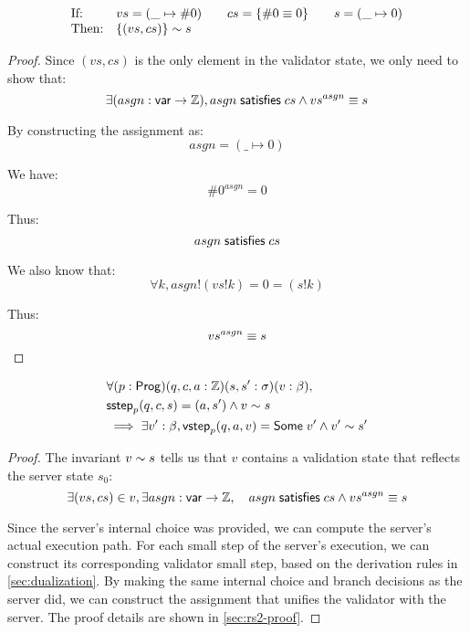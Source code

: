 \begin{lemma}[\ref{eq:rs1}]
\[\begin{array}{ll}
\text{If:}&
vs=(\_\mapsto\#0)\qquad
cs=\{\#0\equiv0\}\qquad
s=(\_\mapsto0)\\
\text{Then:}&\{(vs,cs)\}\sim s
\end{array}\]
\end{lemma}
\begin{proof}
Since $(vs,cs)$ is the only element in the validator state, we only need to show
that:
\[\exists(asgn:\mathsf{var}\to\mathbb Z),asgn\;\mathsf{satisfies}\;cs\wedge vs^{asgn}\equiv s\]

By constructing the assignment as: \[asgn=(\_\mapsto0)\]

We have: \[\#0^{asgn}=0\]

Thus: \[asgn\;\mathsf{satisfies}\;cs\]

We also know that: \[\forall k, asgn!(vs!k)=0=(s!k)\]

Thus: \[vs^{asgn}\equiv s\qedhere\]
\end{proof}

\begin{lemma}[\ref{eq:rs2}]
  \begin{align*}
    &\forall(p:\mathsf{Prog})(q,c,a:\mathbb Z)(s,s':\sigma)(v:\beta),\\
    &\mathsf{sstep}_p(q,c,s)=(a,s')\wedge v\sim s\\
    &\implies\exists v':\beta,\mathsf{vstep}_p(q,a,v)=\mathsf{Some}\;v'\wedge v'\sim s'
  \end{align*}
\begin{proof}
The invariant $v\sim s$ tells us that $v$ contains a validation state
that reflects the server state $s_0$:
\[\exists(vs,cs)\in v,\exists asgn:\mathsf{var}\to\mathbb Z,\quad asgn\;\mathsf{satisfies}\;cs\wedge {vs}^{asgn}\equiv s\]

Since the server's internal choice was provided, we can compute the server's
actual execution path.  For each small step of the server's execution, we can
construct its corresponding validator small step, based on the derivation rules
in \autoref{sec:dualization}.  By making the same internal choice and branch
decisions as the server did, we can construct the assignment that unifies the
validator with the server.  The proof details are shown in \autoref{sec:rs2-proof}.
\end{proof}
\end{lemma}

